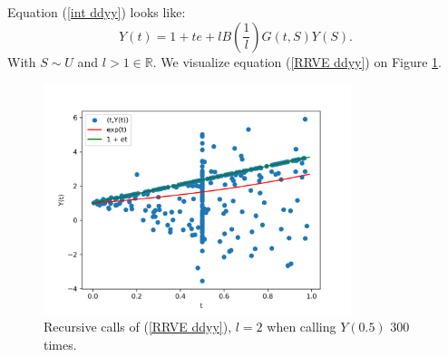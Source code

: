 \documentclass[a4paper,12pt]{article}
\begin{document}
\begin{example}[$y''=y$]
    Equation (\ref{int ddyy}) looks like:
    \begin{equation} \label{RRVE ddyy}
        Y(t) = 1 + te + l B\left(\frac{1}{l}\right)G(t,S)Y(S).
    \end{equation}
    With $S \sim U$ and $l>1 \in  \mathbb{R}$. We visualize equation (\ref{RRVE ddyy}) on
    Figure \ref{fig:ddyy}.

    \begin{figure}[h!]
        \centering
        \includegraphics[width=0.8\textwidth]{plots/ddyy.png}
        \caption{Recursive calls of (\ref{RRVE ddyy}), $l=2$ when
            calling $Y(0.5)$ $300$ times.}
        \label{fig:ddyy}
    \end{figure}

\end{example}


%
%
%
\end{document}
